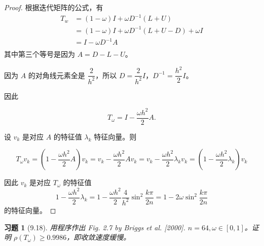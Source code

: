\documentclass{ctexart}
\newtheorem{ex}{习题}
\begin{document}
\begin{proof}
根据迭代矩阵的公式，有
\begin{equation}
\begin{split}
    T_w & = (1-\omega)I + \omega D^{-1}(L+U) \\
        & = (1-\omega)I + \omega D^{-1}(L+U-D) + \omega I \\
        & = I - \omega D^{-1}A \\
\end{split}
\end{equation}
其中第三个等号是因为 $A = D-L-U$。

因为 $A$ 的对角线元素全是 $\dfrac 2{h^2}$，所以 $D = \dfrac 2{h^2}I$，$D^{-1} = \dfrac {h^2}2I$。

因此

\begin{equation}
    T_{\omega} = I - \dfrac {\omega h^2}2 A.
\end{equation}

设 $v_k$ 是对应 $A$ 的特征值 $\lambda_k$ 特征向量。则

\begin{equation}
    T_\omega v_k = (1 - \dfrac{\omega h^2}2 A)v_k
                 = v_k - \dfrac{\omega h^2}2 Av_k
                 = v_k - \dfrac{\omega h^2}2 \lambda_kv_k
                 = (1 - \dfrac{\omega h^2}2\lambda_k)v_k
\end{equation}

因此 $v_k$ 是对应 $T_\omega$ 的特征值 
\begin{equation}
    1 - \dfrac{\omega h^2}2\lambda_k
    = 1 - \dfrac{\omega h^2}2\dfrac 4{h^2}\sin^2\dfrac {k\pi}{2n}
    = 1 - 2\omega \sin^2\dfrac{k\pi}{2n}
\end{equation}
的特征向量。
\end{proof}

\begin{ex}[9.18]
    用程序作出 Fig. 2.7 by Briggs et al. [2000]. $n=64,\omega\in [0,1]$。证明 $\rho(T_\omega)\geq 0.9986$，即收敛速度缓慢。
\end{ex}
\end{document}
